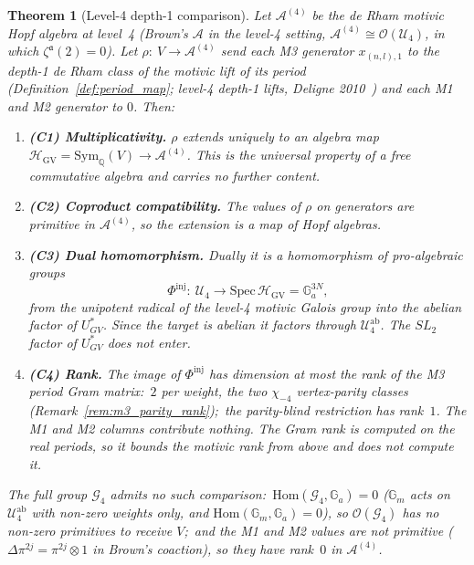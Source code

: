 \documentclass[11pt,a4paper]{article}
\theoremstyle{plain}
\newtheorem{theorem}{Theorem}[section]
\theoremstyle{definition}
\newcommand{\HGV}{\mathcal{H}_{\mathrm{GV}}}
\newcommand{\Sym}{\mathrm{Sym}}
\newcommand{\Ga}{\mathbb{G}_{a}}
\newcommand{\Gm}{\mathbb{G}_{m}}
\newcommand{\Q}{\mathbb{Q}}
\newcommand{\Ustar}{U^{*}}
\begin{document}
\begin{theorem}[Level-4 depth-1 comparison]\label{thm:injection_g4}
Let $\mathcal{A}^{(4)}$ be the de Rham motivic Hopf algebra at level~4
(Brown's $\mathcal{A}$ in the level-4 setting, $\mathcal{A}^{(4)} \cong
\mathcal{O}(\mathcal{U}_{4})$, in which $\zeta^{\mathfrak{a}}(2) = 0$). Let
$\rho:\ V \to \mathcal{A}^{(4)}$ send each M3 generator $x_{(n, l), 1}$ to
the depth-1 de Rham class of the motivic lift of its period
(Definition~\ref{def:period_map}; level-4 depth-1 lifts, Deligne
2010~\cite{deligne2010}) and each M1 and M2 generator to $0$. Then:
\begin{enumerate}
\item \textbf{(C1) Multiplicativity.} $\rho$ extends uniquely to an algebra
map $\HGV = \Sym_{\Q}(V) \to \mathcal{A}^{(4)}$. This is the universal
property of a free commutative algebra and carries no further content.
\item \textbf{(C2) Coproduct compatibility.} The values of $\rho$ on
generators are primitive in $\mathcal{A}^{(4)}$, so the extension is a
map of Hopf algebras.
\item \textbf{(C3) Dual homomorphism.} Dually it is a homomorphism of
pro-algebraic groups
\[
   \Phi^{\mathrm{inj}}:\ \mathcal{U}_{4} \longrightarrow \mathrm{Spec}\,\HGV = \Ga^{3N},
\]
\emph{from} the unipotent radical of the level-4 motivic Galois group
\emph{into} the abelian factor of $\Ustar_{GV}$. Since the target is
abelian it factors through $\mathcal{U}_{4}^{\mathrm{ab}}$. The $SL_{2}$
factor of $\Ustar_{GV}$ does not enter.
\item \textbf{(C4) Rank.} The image of $\Phi^{\mathrm{inj}}$ has dimension
at most the rank of the M3 period Gram matrix:\ $2$ per weight, the two
$\chi_{-4}$ vertex-parity classes (Remark~\ref{rem:m3_parity_rank});\ the
parity-blind restriction has rank~$1$. The M1 and M2 columns contribute
nothing. The Gram rank is computed on the real periods, so it bounds the
motivic rank from above and does not compute it.
\end{enumerate}
The full group $\mathcal{G}_{4}$ admits no such comparison:\
$\mathrm{Hom}(\mathcal{G}_{4}, \Ga) = 0$ ($\Gm$ acts on
$\mathcal{U}_{4}^{\mathrm{ab}}$ with non-zero weights only, and
$\mathrm{Hom}(\Gm, \Ga) = 0$), so $\mathcal{O}(\mathcal{G}_{4})$ has no
non-zero primitives to receive $V$;\ and the M1 and M2 values are not
primitive ($\Delta \pi^{2j} = \pi^{2j} \otimes 1$ in Brown's coaction), so
they have rank~$0$ in $\mathcal{A}^{(4)}$.
\end{theorem}
\end{document}
